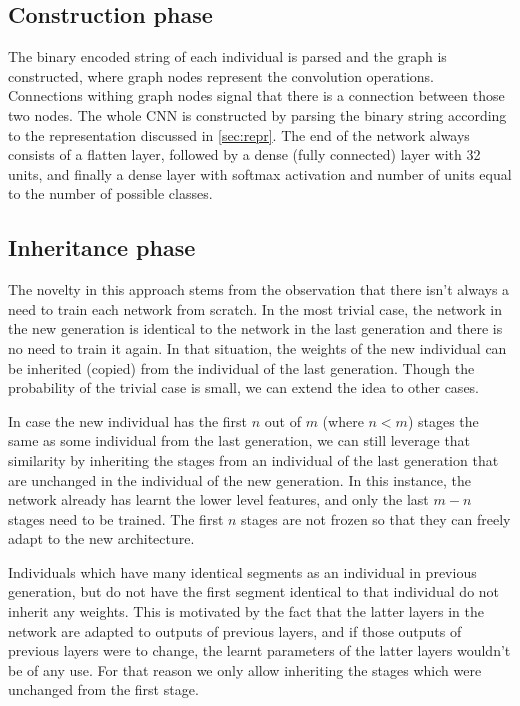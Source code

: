 \documentclass[eng]{simposium}
\begin{document}
\subsection{Construction phase}
The binary encoded  string of each individual is parsed and the graph is constructed, where graph nodes represent the convolution operations.
Connections withing graph nodes signal that there is a connection between those two nodes.
The whole CNN is constructed by parsing the binary string according to the representation discussed in \ref{sec:repr}. 
The end of the network always consists of a flatten layer, followed by a dense (fully connected) layer with 32 units, and finally a dense 
layer with softmax activation and number of units equal to the number of possible classes.

\subsection{Inheritance phase}
The novelty in this approach stems from the observation that there isn't always a need to train each network from scratch.
In the most trivial case, the network in the new generation is identical to the network in the last generation and there is no need to train it again.
In that situation, the weights of the new individual can be inherited (copied) from the individual of the last generation.
Though the probability of the trivial case is small, we can extend the idea to other cases.

In case the new individual has the first $n$ out of $m$ (where $n < m$) stages the same as some individual from the last generation, we can still leverage that similarity
by inheriting the stages from an individual of the last generation that are unchanged in the individual of the new generation.
In this instance, the network already has learnt the lower level features, and only the last $m-n$ stages need to be trained.
The first $n$ stages are not frozen so that they can freely adapt to the new architecture. 

Individuals which have many identical segments as an individual in previous generation, but do not have the first segment identical to that individual do not inherit any 
weights. This is motivated by the fact that the latter layers in the network are adapted to outputs of previous layers, and if those outputs of previous layers were to change, 
the learnt parameters of the latter layers wouldn't be of any use.
For that reason we only allow inheriting the stages which were unchanged from the first stage.
\end{document}
